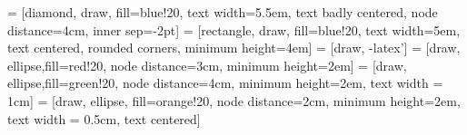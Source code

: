 \documentclass{article}
\begin{document}
\pagestyle{empty}


 = [diamond, draw, fill=blue!20, 
    text width=5.5em, text badly centered, node distance=4cm, inner sep=-2pt]
 = [rectangle, draw, fill=blue!20, 
    text width=5em, text centered, rounded corners, minimum height=4em]
 = [draw, -latex']
 = [draw, ellipse,fill=red!20, node distance=3cm,
    minimum height=2em]
 = [draw, ellipse,fill=green!20, node distance=4cm,
    minimum height=2em, text width = 1cm]
 = [draw, ellipse, fill=orange!20, node distance=2cm,
    minimum height=2em, text width = 0.5cm, text centered]
    
\end{document}

